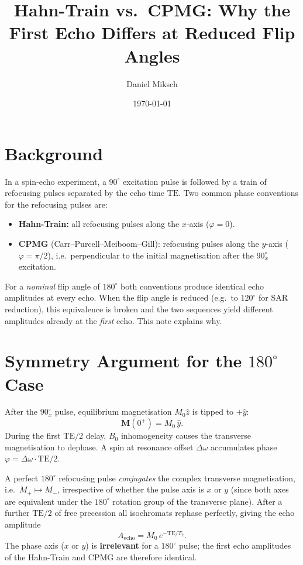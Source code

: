 \documentclass[11pt, a4paper]{article}
\title{Hahn-Train vs.\ CPMG: Why the First Echo Differs at Reduced Flip Angles}
\author{Daniel Miksch}
\date{\today}
\begin{document}
\maketitle

\section{Background}

In a spin-echo experiment, a $90^\circ$ excitation pulse is followed by a train of refocusing
pulses separated by the echo time $\mathrm{TE}$.  Two common phase conventions for the
refocusing pulses are:

\begin{itemize}
  \item \textbf{Hahn-Train:} all refocusing pulses along the $x$-axis ($\varphi = 0$).
  \item \textbf{CPMG} (Carr--Purcell--Meiboom--Gill): refocusing pulses along the $y$-axis
        ($\varphi = \pi/2$), i.e.\ perpendicular to the initial magnetisation after the
        $90^\circ_x$ excitation.
\end{itemize}

For a \emph{nominal} flip angle of $180^\circ$ both conventions produce identical echo
amplitudes at every echo.  When the flip angle is reduced (e.g.\ to $120^\circ$ for SAR
reduction), this equivalence is broken and the two sequences yield different amplitudes
already at the \emph{first} echo.  This note explains why.

\section{Symmetry Argument for the $180^\circ$ Case}

After the $90^\circ_x$ pulse, equilibrium magnetisation $M_0\hat{z}$ is tipped to
$+\hat{y}$:
\begin{equation}
  \mathbf{M}(0^+) = M_0\,\hat{y}.
\end{equation}
During the first $\mathrm{TE}/2$ delay, $B_0$ inhomogeneity causes the transverse
magnetisation to dephase.  A spin at resonance offset $\Delta\omega$ accumulates phase
$\varphi = \Delta\omega\cdot\mathrm{TE}/2$.

A perfect $180^\circ$ refocusing pulse \emph{conjugates} the complex transverse
magnetisation, i.e.\ $M_+ \mapsto M_-$, irrespective of whether the pulse axis is $x$
or $y$ (since both axes are equivalent under the $180^\circ$ rotation group of the
transverse plane).  After a further $\mathrm{TE}/2$ of free precession all isochromats
rephase perfectly, giving the echo amplitude
\begin{equation}
  A_{\mathrm{echo}} = M_0\,e^{-\mathrm{TE}/T_2}.
\end{equation}
The phase axis ($x$ or $y$) is \textbf{irrelevant} for a $180^\circ$ pulse; the first
echo amplitudes of the Hahn-Train and CPMG are therefore identical.
\end{document}

